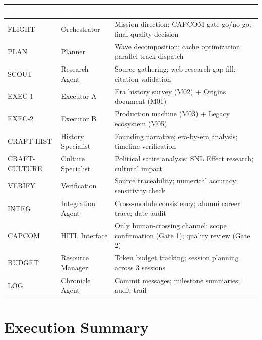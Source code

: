 \documentclass[11pt,letterpaper]{article}
\newcommand{\tableheader}[1]{\textbf{\sffamily\textcolor{white}{#1}}}
\begin{document}
\begin{center}
\begin{tabularx}{\textwidth}{L{1.8cm}L{3cm}X}
\toprule
{}
\tableheader{Role} & \tableheader{Agent} & \tableheader{Responsibility} \\
\midrule
FLIGHT & Orchestrator & Mission direction; CAPCOM gate go/no-go; final quality decision \\
PLAN & Planner & Wave decomposition; cache optimization; parallel track dispatch \\
SCOUT & Research Agent & Source gathering; web research gap-fill; citation validation \\
EXEC-1 & Executor A & Era history survey (M02) + Origins document (M01) \\
EXEC-2 & Executor B & Production machine (M03) + Legacy ecosystem (M05) \\
CRAFT-HIST & History Specialist & Founding narrative; era-by-era analysis; timeline verification \\
CRAFT-CULTURE & Culture Specialist & Political satire analysis; SNL Effect research; cultural impact \\
VERIFY & Verification & Source traceability; numerical accuracy; sensitivity check \\
INTEG & Integration Agent & Cross-module consistency; alumni career trace; date audit \\
CAPCOM & HITL Interface & Only human-crossing channel; scope confirmation (Gate 1); quality review (Gate 2) \\
BUDGET & Resource Manager & Token budget tracking; session planning across 3 sessions \\
LOG & Chronicle Agent & Commit messages; milestone summaries; audit trail \\
\bottomrule
\end{tabularx}
\end{center}

\section{Execution Summary}
\end{document}
